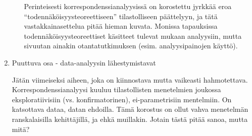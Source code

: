 \begin{enumerate}
\begin{enumerate}
Perinteisesti korrespondenssianalyysissä on korostettu jyrkkää eroa ``todennäköisyysteoreettiseen'' tilastolliseen päättelyyn, ja tätä vastakkainasettelua pitää hieman kuvata. Monissa tapauksissa todennäköisyysteoreettiset käsitteet tulevat mukaan analyysiin, mutta sivuutan ainakin otantatutkimuksen (esim. analyysipainojen käyttö).
\end{enumerate} %

\item Puuttuva osa - data-analyysin lähestymistavat

Jätän viimeiseksi aiheen, joka on kiinnostava mutta vaikeasti hahmotettava. Korrespondenssianalyysi kuuluu tilastollisten menetelmien joukossa eksploratiivisiin (vs. konfirmatorinen), ei-parametrisiin mentelmiin. On katsottava dataa, datan ehdoilla. Tämä korostus on ollut vahva menetelmän ranskalaisilla kehittäjillä, ja ehkä muillakin. Jotain tästä pitää sanoa, mutta mitä?

\end{enumerate} %



